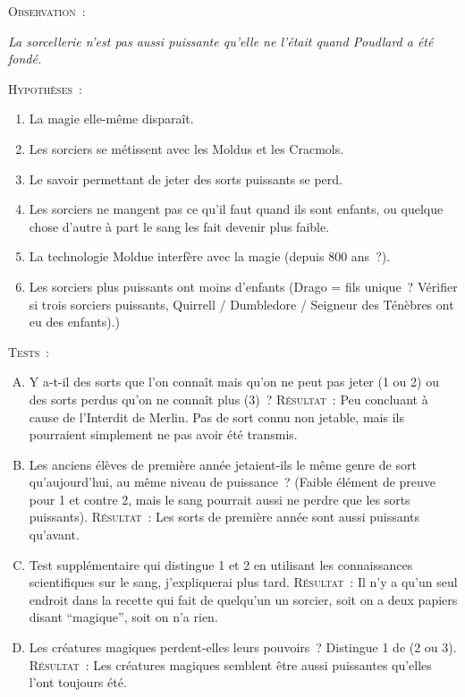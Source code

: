 \begin{writtenNote}
\baselineskip 

\savetrivseps
\setlength{\topsep}{0pt}
\setlength{\partopsep}{0pt}

\begin{centering}
\scshape Observation~:

\itshape La sorcellerie n'est pas aussi puissante qu'elle ne l'était quand Poudlard a été fondé.

\baselineskip

\scshape Hypothèses~:
\itshape
        \begin{enumerate}[1.]
        \item La magie elle-même disparaît.
        \item Les sorciers se métissent avec les Moldus et les Cracmols.
        \item Le savoir permettant de jeter des sorts puissants se perd.
        \item Les sorciers ne mangent pas ce qu'il faut quand ils sont enfants, ou quelque chose d'autre à part le sang les fait devenir plus faible.
        \item La technologie Moldue interfère avec la magie (depuis 800 ans~?).
        \item Les sorciers plus puissants ont moins d'enfants (Drago = fils unique~? Vérifier si trois sorciers puissants, Quirrell / Dumbledore / Seigneur des Ténèbres ont eu des enfants).)
        \end{enumerate}

\baselineskip

\scshape Tests~:
\itshape
        \begin{enumerate}[A.]
        \item Y a-t-il des sorts que l'on connaît mais qu'on ne peut pas jeter (1 ou 2) ou des sorts perdus qu'on ne connaît plus (3)~? {\scshape Résultat~:} Peu concluant à cause de l'Interdit de Merlin. Pas de sort connu non jetable, mais ils pourraient simplement ne pas avoir été transmis.
        \item Les anciens élèves de première année jetaient-ils le même genre de sort qu'aujourd'hui, au même niveau de puissance~? (Faible élément de preuve pour 1 et contre 2, mais le sang pourrait aussi ne perdre que les sorts puissants). {\scshape Résultat~:} Les sorts de première année sont aussi puissants qu'avant.
        \item Test supplémentaire qui distingue 1 et 2 en utilisant les connaissances scientifiques sur le sang, j'expliquerai plus tard. {\scshape Résultat~:} Il n'y a qu'un seul endroit dans la recette qui fait de quelqu'un un sorcier, soit on a deux papiers disant “magique”, soit on n'a rien.
        \item Les créatures magiques perdent-elles leurs pouvoirs~? Distingue 1 de (2 ou 3). {\scshape Résultat~:} Les créatures magiques semblent être aussi puissantes qu'elles l'ont toujours été.
        \end{enumerate}
\end{centering}

\baselineskip
\end{writtenNote}

